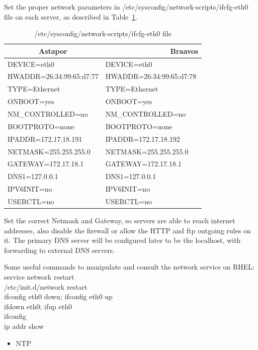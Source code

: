 \documentclass[a4paper, 12pt]{book}
\begin{document}
\noindent Set the proper network parameters in /etc/sysconfig/network-scripts/ifcfg-eth0 file on each server, as described in Table~\ref{table:ifcfg}.

\FloatBarrier
\begin{table}[H]
  \centering
  \begin{tabular}{ | l | l | }
    \hline
    \multicolumn{1}{|c|}{Astapor} & {\ \ \ \ \ \ \ \ \ \ \ \ \ \ \ \ Braavos} \\
    \hline
    DEVICE=eth0 & DEVICE=eth0 \\
    HWADDR=26:34:99:65:d7:77 & HWADDR=26:34:99:65:d7:78\\
    TYPE=Ethernet & TYPE=Ethernet\\
    ONBOOT=yes & ONBOOT=yes\\
    NM\_CONTROLLED=no & NM\_CONTROLLED=no\\
    BOOTPROTO=none & BOOTPROTO=none\\
    IPADDR=172.17.18.191 & IPADDR=172.17.18.192\\
    NETMASK=255.255.255.0 & NETMASK=255.255.255.0\\
    GATEWAY=172.17.18.1	& GATEWAY=172.17.18.1\\
	DNS1=127.0.0.1 & DNS1=127.0.0.1\\
	IPV6INIT=no & IPV6INIT=no\\
	USERCTL=no & USERCTL=no\\
    \hline
  \end{tabular}
\caption{/etc/sysconfig/network-scripts/ifcfg-eth0 file}
\label{table:ifcfg}
\end{table}


\noindent Set the correct Netmask and Gateway, so servers are able to reach internet addresses, also disable the firewall or allow the HTTP and ftp outgoing rules on it. The primary DNS server will be configured later to be the localhost, with forwarding to external DNS servers.\bigskip

\noindent Some useful commands to manipulate and consult the network service on RHEL:\\
\indent service network restart\\
\indent /etc/init.d/network restart\\
\indent ifconfig eth0 down; ifconfig eth0 up\\
\indent ifdown eth0; ifup eth0\\
\indent ifconfig\\
\indent ip addr show

\begin{itemize}[leftmargin=*]
	\item NTP
\end{itemize}
\end{document}
